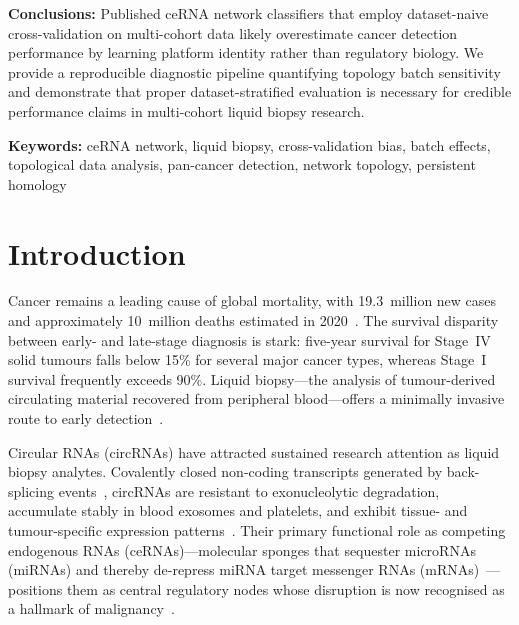 \documentclass[12pt]{article}
\begin{document}
\noindent\textbf{Conclusions:}
Published ceRNA network classifiers that employ dataset-naive
cross-validation on multi-cohort data likely overestimate cancer
detection performance by learning platform identity rather than
regulatory biology. We provide a reproducible diagnostic pipeline
quantifying topology batch sensitivity and demonstrate that proper
dataset-stratified evaluation is necessary for credible performance
claims in multi-cohort liquid biopsy research.

\vspace{0.3cm}
\noindent\textbf{Keywords:} ceRNA network, liquid biopsy, cross-validation bias,
batch effects, topological data analysis, pan-cancer detection,
network topology, persistent homology

\newpage

\section{Introduction}

Cancer remains a leading cause of global mortality, with 19.3~million
new cases and approximately 10~million deaths estimated in
2020~\citep{sung2021}. The survival disparity between early- and
late-stage diagnosis is stark: five-year survival for Stage~IV solid
tumours falls below 15\% for several major cancer types, whereas
Stage~I survival frequently exceeds 90\%. Liquid biopsy---the analysis
of tumour-derived circulating material recovered from peripheral
blood---offers a minimally invasive route to early
detection~\citep{cohen2018}.

Circular RNAs (circRNAs) have attracted sustained research attention as
liquid biopsy analytes. Covalently closed non-coding transcripts
generated by back-splicing events~\citep{memczak2013,hansen2013},
circRNAs are resistant to exonucleolytic degradation, accumulate stably
in blood exosomes and platelets, and exhibit tissue- and tumour-specific
expression patterns~\citep{kristensen2019,vo2019}. Their primary
functional role as competing endogenous RNAs (ceRNAs)---molecular
sponges that sequester microRNAs (miRNAs) and thereby de-repress miRNA
target messenger RNAs (mRNAs)~\citep{salmena2011}---positions them as
central regulatory nodes whose disruption is now recognised as a
hallmark of malignancy~\citep{meng2017}.
\end{document}
